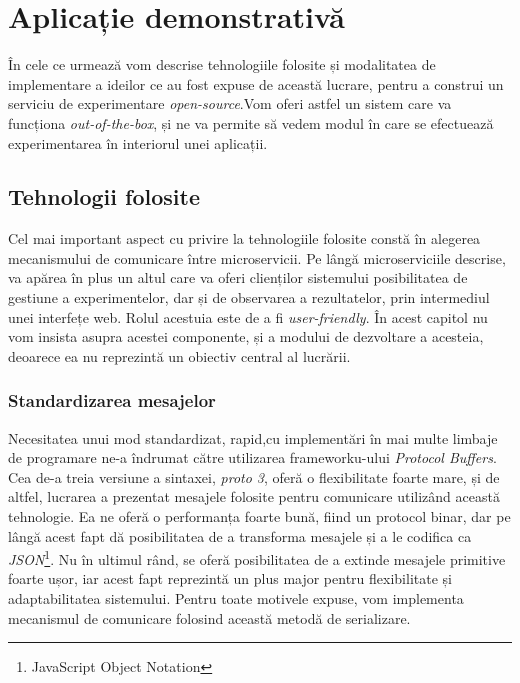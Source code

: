 \chapter{Aplicație demonstrativă}

În cele ce urmează vom descrise tehnologiile folosite și modalitatea de implementare a ideilor ce au fost expuse de această lucrare, pentru a construi un serviciu de experimentare \textit{open-source}.Vom oferi astfel un sistem care va funcționa \textit{out-of-the-box}, și ne va permite să vedem modul în care se efectuează experimentarea în interiorul unei aplicații. 


\section{Tehnologii folosite}

Cel mai important aspect cu privire la tehnologiile folosite constă în alegerea mecanismului de comunicare între microservicii. Pe lângă microserviciile descrise, va apărea în plus un altul care va oferi clienților sistemului posibilitatea de gestiune a experimentelor, dar și de observarea a rezultatelor, prin intermediul unei interfețe web. Rolul acestuia este de a fi \textit{user-friendly}. În acest capitol nu vom insista asupra acestei componente, și a modului de dezvoltare a acesteia, deoarece ea nu reprezintă un obiectiv central al lucrării.

\subsection{Standardizarea mesajelor}

Necesitatea unui mod standardizat, rapid,cu implementări în mai multe limbaje de programare ne-a îndrumat către utilizarea frameworku-ului \textit{Protocol Buffers}. Cea de-a treia versiune a sintaxei, \textit{proto 3}, oferă o flexibilitate foarte mare, și de altfel, lucrarea a prezentat mesajele folosite pentru comunicare utilizând această tehnologie. Ea ne oferă o performanța foarte bună, fiind un protocol binar, dar pe lângă acest fapt dă posibilitatea de a transforma mesajele și a le codifica ca \textit{JSON}\footnote{JavaScript Object Notation}. Nu în ultimul rând, se oferă posibilitatea de a extinde mesajele primitive foarte ușor, iar acest fapt reprezintă un plus major pentru flexibilitate și adaptabilitatea sistemului. Pentru toate motivele expuse, vom implementa mecanismul de comunicare folosind această metodă de serializare. 

